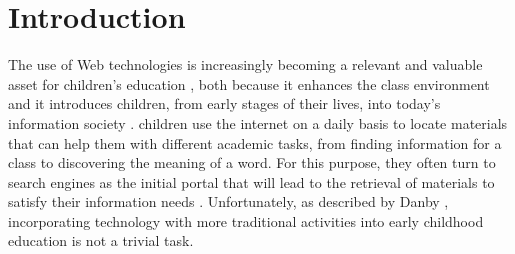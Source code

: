 \documentclass{sig-alternate-05-2015}
\begin{document}
%
%

%
%
\printccsdesc



\section{Introduction}
The use of Web technologies is increasingly becoming a relevant and valuable asset for children's education \cite{Kni14}, both because it enhances the class environment and it introduces children, from early stages of their lives, into today's information society \cite{Sad12}. children use the internet on a daily basis to locate materials that can help them with different academic tasks, from finding information for a class to discovering the meaning of a word. For this purpose, they often turn to search engines as the initial portal that will lead to the retrieval of materials to satisfy their information needs \cite{Kni14}. Unfortunately, as described by Danby \cite{Dan13}, incorporating technology with more traditional activities into early childhood education is not a trivial task.
\end{document}
